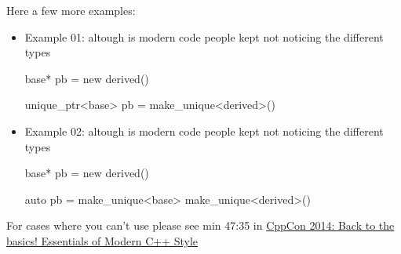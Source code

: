 \newpage
\noindent Here a few more examples:\\
\begin{itemize}
    \item  Example 01: altough is modern code people kept not noticing the different types\\
    \begin{minipage}{\MPWxXXSxLISTING\textwidth} %
{} %
        \begin{CPPCode}
base* pb = new derived()
        \end{CPPCode}
    \end{minipage}
    \begin{minipage}{\MPWxSxLISTING\textwidth} %
        \begin{CPPCode}
unique_ptr<base> pb = make_unique<derived>()
        \end{CPPCode}
    \end{minipage}

    \item  Example 02: altough is modern code people kept not noticing the different types\\
    \begin{minipage}{\MPWxXXSxLISTING\textwidth} %
{} %
        \begin{CPPCode}
base* pb = new derived()
        \end{CPPCode}
    \end{minipage}
    \begin{minipage}{\MPWxSxLISTING\textwidth} %
        \begin{CPPCode}
auto pb = make_unique<base>{ make_unique<derived>() }
        \end{CPPCode}
    \end{minipage}
\end{itemize}

\noindent For cases where you can't use  please see min 47:35 in \href{https://www.youtube.com/watch?v=xnqTKD8uD64}{CppCon 2014: Back to the basics! Essentials of Modern C++ Style}


